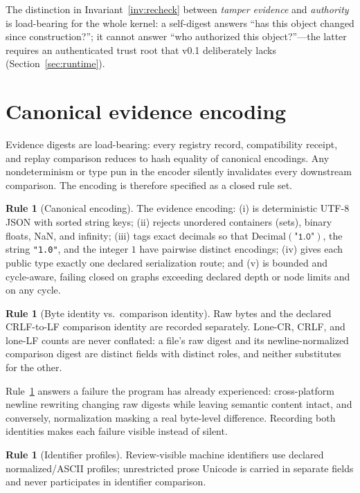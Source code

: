 \documentclass[11pt]{amsart}
\theoremstyle{definition}
\newtheorem{ruleenv}[theorem]{Rule}
\theoremstyle{remark}
\begin{document}
The distinction in Invariant~\ref{inv:recheck} between \emph{tamper evidence} and \emph{authority} is load-bearing for the whole kernel: a self-digest answers ``has this object changed since construction?''; it cannot answer ``who authorized this object?''---the latter requires an authenticated trust root that v0.1 deliberately lacks (Section~\ref{sec:runtime}).

\section{Canonical evidence encoding}\label{sec:encoding}

Evidence digests are load-bearing: every registry record, compatibility receipt, and replay comparison reduces to hash equality of canonical encodings. Any nondeterminism or type pun in the encoder silently invalidates every downstream comparison. The encoding is therefore specified as a closed rule set.

\begin{ruleenv}[Canonical encoding]\label{rule:encoding}
The evidence encoding: (i) is deterministic UTF-8 JSON with sorted string keys; (ii) rejects unordered containers (sets), binary floats, NaN, and infinity; (iii) tags exact decimals so that $\mathrm{Decimal}(\texttt{"1.0"})$, the string \texttt{"1.0"}, and the integer $1$ have pairwise distinct encodings; (iv) gives each public type exactly one declared serialization route; and (v) is bounded and cycle-aware, failing closed on graphs exceeding declared depth or node limits and on any cycle.
\end{ruleenv}

\begin{ruleenv}[Byte identity vs.\ comparison identity]\label{rule:crlf}
Raw bytes and the declared CRLF-to-LF comparison identity are recorded separately. Lone-CR, CRLF, and lone-LF counts are never conflated: a file's raw digest and its newline-normalized comparison digest are distinct fields with distinct roles, and neither substitutes for the other.
\end{ruleenv}

Rule~\ref{rule:crlf} answers a failure the program has already experienced: cross-platform newline rewriting changing raw digests while leaving semantic content intact, and conversely, normalization masking a real byte-level difference. Recording both identities makes each failure visible instead of silent.

\begin{ruleenv}[Identifier profiles]\label{rule:unicode}
Review-visible machine identifiers use declared normalized/ASCII profiles; unrestricted prose Unicode is carried in separate fields and never participates in identifier comparison.
\end{ruleenv}
\end{document}
